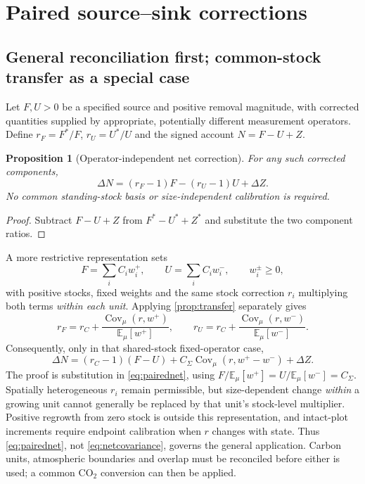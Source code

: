 \documentclass[11pt,a4paper]{article}
\newcommand{\COtwo}{\ensuremath{\mathrm{CO}_2}}
\newcommand{\E}{\mathbb{E}}
\DeclareMathOperator{\Cov}{Cov}
\newtheorem{proposition}{Proposition}[section]
\theoremstyle{remark}
\begin{document}
\section{Paired source--sink corrections}
\subsection{General reconciliation first; common-stock transfer as a special case}
Let $F,U>0$ be a specified source and positive removal magnitude, with corrected quantities supplied by appropriate, potentially different measurement operators. Define $r_F=F^*/F$, $r_U=U^*/U$ and the signed account $N=F-U+Z$.
\begin{proposition}[Operator-independent net correction]\label{prop:paired}
For any such corrected components,
\begin{equation}
 \boxed{\Delta N=(r_F-1)F-(r_U-1)U+\Delta Z.}
 \label{eq:pairednet}
\end{equation}
No common standing-stock basis or size-independent calibration is required.
\end{proposition}
\begin{proof}
Subtract $F-U+Z$ from $F^*-U^*+Z^*$ and substitute the two component ratios.
\end{proof}

A more restrictive representation sets
\begin{equation}
 F=\sum_i C_iw_i^+,\qquad U=\sum_i C_iw_i^-,\qquad w_i^\pm\geq0,
 \label{eq:pairedcomponents}
\end{equation}
with positive stocks, fixed weights and the same stock correction $r_i$ multiplying both terms \emph{within each unit}. Applying \cref{prop:transfer} separately gives
\begin{equation}
 r_F=r_C+\frac{\Cov_\mu(r,w^+)}{\E_\mu[w^+]},\qquad
 r_U=r_C+\frac{\Cov_\mu(r,w^-)}{\E_\mu[w^-]}.
 \label{eq:pairedratios}
\end{equation}
Consequently, only in that shared-stock fixed-operator case,
\begin{equation}
 \Delta N=(r_C-1)(F-U)+C_\Sigma\Cov_\mu(r,w^+-w^-)+\Delta Z.
 \label{eq:netcovariance}
\end{equation}
The proof is substitution in \eqref{eq:pairednet}, using $F/\E_\mu[w^+]=U/\E_\mu[w^-]=C_\Sigma$. Spatially heterogeneous $r_i$ remain permissible, but size-dependent change \emph{within} a growing unit cannot generally be replaced by that unit's stock-level multiplier. Positive regrowth from zero stock is outside this representation, and intact-plot increments require endpoint calibration when $r$ changes with state. Thus \eqref{eq:pairednet}, not \eqref{eq:netcovariance}, governs the general application. Carbon units, atmospheric boundaries and overlap must be reconciled before either is used; a common \COtwo{} conversion can then be applied.
\end{document}
